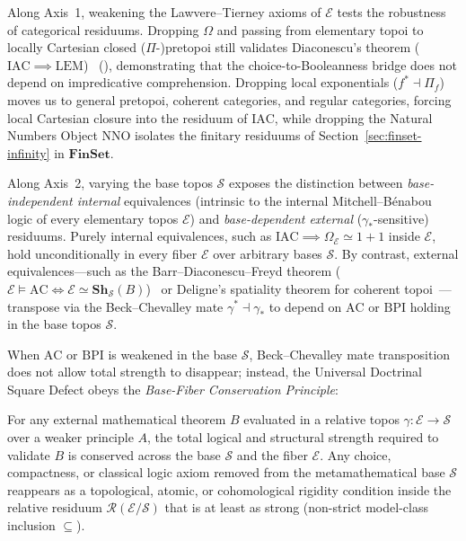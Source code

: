Along Axis~1, weakening the Lawvere--Tierney axioms of $\mathcal{E}$ tests the robustness of categorical residuums. Dropping $\Omega$ and passing from elementary topoi to locally Cartesian closed ($\Pi$-)pretopoi still validates Diaconescu's theorem ($\mathrm{IAC} \implies \mathrm{LEM}$)~\cite{Diaconescu75,Maietti05} (\cite[\S D4.5]{Johnstone02}), demonstrating that the choice-to-Booleanness bridge does not depend on impredicative comprehension. Dropping local exponentials ($f^* \dashv \Pi_f$) moves us to general pretopoi, coherent categories, and regular categories, forcing local Cartesian closure into the residuum of $\mathrm{IAC}$, while dropping the Natural Numbers Object $\mathrm{NNO}$ isolates the finitary residuums of Section~\ref{sec:finset-infinity} in $\mathbf{FinSet}$.

Along Axis~2, varying the base topos $\mathcal{S}$ exposes the distinction between \emph{base-independent internal} equivalences (intrinsic to the internal Mitchell--B\'enabou logic of every elementary topos $\mathcal{E}$) and \emph{base-dependent external} ($\gamma_*$-sensitive) residuums. Purely internal equivalences, such as $\mathrm{IAC} \implies \Omega_{\mathcal{E}} \simeq 1+1$ inside $\mathcal{E}$, hold unconditionally in every fiber $\mathcal{E}$ over arbitrary bases $\mathcal{S}$. By contrast, external equivalences---such as the Barr--Diaconescu--Freyd theorem ($\mathcal{E} \models \mathrm{AC} \iff \mathcal{E} \simeq \mathbf{Sh}_{\mathcal{S}}(B)$)~\cite{Barr74,Diaconescu75,Freyd72} or Deligne's spatiality theorem for coherent topoi~\cite{Deligne72}---transpose via the Beck--Chevalley mate $\gamma^* \dashv \gamma_*$ to depend on $\mathrm{AC}$ or $\mathrm{BPI}$ holding in the base topos $\mathcal{S}$.

When $\mathrm{AC}$ or $\mathrm{BPI}$ is weakened in the base $\mathcal{S}$, Beck--Chevalley mate transposition does not allow total strength to disappear; instead, the Universal Doctrinal Square Defect obeys the \emph{Base-Fiber Conservation Principle}:

\begin{principle}\label{prin:conservation}%
%

For any external mathematical theorem $B$ evaluated in a relative topos $\gamma: \mathcal{E} \to \mathcal{S}$ over a weaker principle $A$, the total logical and structural strength required to validate $B$ is conserved across the base $\mathcal{S}$ and the fiber $\mathcal{E}$. Any choice, compactness, or classical logic axiom removed from the metamathematical base $\mathcal{S}$ reappears as a topological, atomic, or cohomological rigidity condition inside the relative residuum $\mathcal{R}(\mathcal{E}/\mathcal{S})$ that is at least as strong (non-strict model-class inclusion $\subseteq$).

\end{principle}

